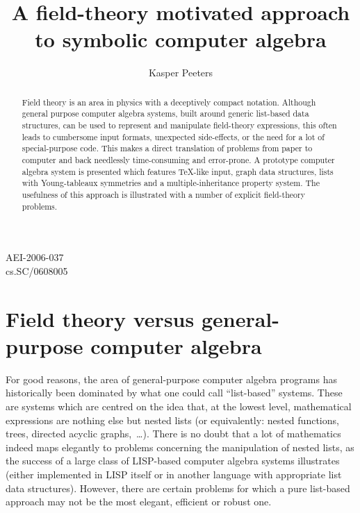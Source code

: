 \documentclass{elsart}
\begin{document}
\begin{flushright}
AEI-2006-037\\cs.SC/0608005
\end{flushright}
\begin{frontmatter}
\title{A field-theory motivated approach to symbolic computer algebra}
\author{Kasper Peeters}
\address{Max-Planck-Institut f\"ur Gravitationsphysik, Albert-Einstein-Institut\\Am M\"uhlenberg
  1, 14476 Golm, GERMANY}
\begin{abstract}
  Field theory is an area in physics with a deceptively compact
  notation. Although general purpose computer algebra systems, built
  around generic list-based data structures, can be used to represent
  and manipulate field-theory expressions, this often leads to
  cumbersome input formats, unexpected side-effects, or the need for a
  lot of special-purpose code. This makes a direct translation of
  problems from paper to computer and back needlessly time-consuming
  and error-prone.  A prototype computer algebra system is presented
  which features \TeX-like input, graph data structures, lists with
  Young-tableaux symmetries and a multiple-inheritance property
  system. The usefulness of this approach is illustrated with a number
  of explicit field-theory problems.
\end{abstract}
\end{frontmatter}


\section{Field theory versus general-purpose computer algebra}

For good reasons, the area of general-purpose computer algebra programs
has historically been dominated by what one could call ``list-based''
systems. These are systems which are centred on the idea that, at the
lowest level, mathematical expressions are nothing else but nested
lists (or equivalently: nested functions, trees, directed acyclic
graphs,~\ldots). There is no doubt that a lot of mathematics indeed
maps elegantly to problems concerning the manipulation of nested
lists, as the success of a large class of LISP-based computer algebra
systems illustrates (either implemented in LISP itself or in another
language with appropriate list data structures).  However, there are
certain problems for which a pure list-based approach may not be the
most elegant, efficient or robust one.
\end{document}
